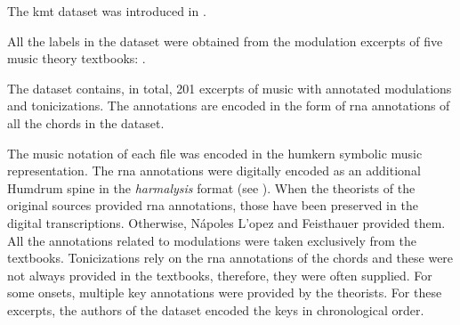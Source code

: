 
The \gls{kmt} dataset was introduced in
\textcite{napoleslopez2020local}.

All the labels in the dataset were obtained from the
modulation excerpts of five music theory textbooks:
\textcite{aldwell2019harmony, kostka2008tonal,
reger1904supplement, rimskikorsakov1886practical,
tchaikovsky1872guide}.

The dataset contains, in total, 201 excerpts of music with
annotated modulations and tonicizations. The annotations are
encoded in the form of \gls{rna} annotations of all the
chords in the dataset. 

The music notation of each file was encoded in the
\gls{humkern} symbolic music representation. The \gls{rna}
annotations were digitally encoded as an additional Humdrum
\gls{spine} in the \emph{harmalysis} format (see
). When the theorists of the
original sources provided \gls{rna} annotations, those have
been preserved in the digital transcriptions. Otherwise,
N\'apoles L'opez and Feisthauer provided them. All the
annotations related to modulations were taken exclusively
from the textbooks. Tonicizations rely on the \gls{rna}
annotations of the chords and these were not always provided
in the textbooks, therefore, they were often supplied. For
some onsets, multiple key annotations were provided by the
theorists. For these excerpts, the authors of the dataset
encoded the keys in chronological order.

